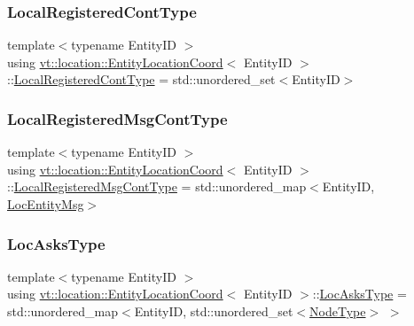 \subsubsection{\texorpdfstring{Local\+Registered\+Cont\+Type}{LocalRegisteredContType}}
{\footnotesize\ttfamily template$<$typename Entity\+ID $>$ \\
using \hyperlink{structvt_1_1location_1_1_entity_location_coord}{vt\+::location\+::\+Entity\+Location\+Coord}$<$ Entity\+ID $>$\+::\hyperlink{structvt_1_1location_1_1_entity_location_coord_a90aee70e2e80fe4c1abf1d0616113708}{Local\+Registered\+Cont\+Type} =  std\+::unordered\+\_\+set$<$Entity\+ID$>$}

\mbox{\label{structvt_1_1location_1_1_entity_location_coord_a0c6d24fed6c690ac6d044b11d884df65}} 
\subsubsection{\texorpdfstring{Local\+Registered\+Msg\+Cont\+Type}{LocalRegisteredMsgContType}}
{\footnotesize\ttfamily template$<$typename Entity\+ID $>$ \\
using \hyperlink{structvt_1_1location_1_1_entity_location_coord}{vt\+::location\+::\+Entity\+Location\+Coord}$<$ Entity\+ID $>$\+::\hyperlink{structvt_1_1location_1_1_entity_location_coord_a0c6d24fed6c690ac6d044b11d884df65}{Local\+Registered\+Msg\+Cont\+Type} =  std\+::unordered\+\_\+map$<$Entity\+ID, \hyperlink{structvt_1_1location_1_1_entity_location_coord_ab0db07ed0b9f75712922733dd467b100}{Loc\+Entity\+Msg}$>$}

\mbox{\label{structvt_1_1location_1_1_entity_location_coord_a492ca5404229c05923f69bae396f2ac4}} 
\subsubsection{\texorpdfstring{Loc\+Asks\+Type}{LocAsksType}}
{\footnotesize\ttfamily template$<$typename Entity\+ID $>$ \\
using \hyperlink{structvt_1_1location_1_1_entity_location_coord}{vt\+::location\+::\+Entity\+Location\+Coord}$<$ Entity\+ID $>$\+::\hyperlink{structvt_1_1location_1_1_entity_location_coord_a492ca5404229c05923f69bae396f2ac4}{Loc\+Asks\+Type} =  std\+::unordered\+\_\+map$<$Entity\+ID, std\+::unordered\+\_\+set$<$\hyperlink{namespacevt_a866da9d0efc19c0a1ce79e9e492f47e2}{Node\+Type}$>$ $>$}


